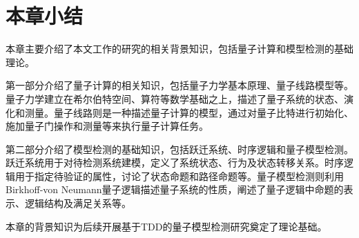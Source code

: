 \section{本章小结}
本章主要介绍了本文工作的研究的相关背景知识，包括量子计算和模型检测的基础理论。

第一部分介绍了量子计算的相关知识，包括量子力学基本原理、量子线路模型等。量子力学建立在希尔伯特空间、算符等数学基础之上，描述了量子系统的状态、演化和测量。量子线路则是一种描述量子计算的模型，通过对量子比特进行初始化、施加量子门操作和测量等来执行量子计算任务。

第二部分介绍了模型检测的基础知识，包括跃迁系统、时序逻辑和量子模型检测。跃迁系统用于对待检测系统建模，定义了系统状态、行为及状态转移关系。时序逻辑用于指定待验证的属性，讨论了状态命题和路径命题等。量子模型检测则利用Birkhoff-von Neumann量子逻辑描述量子系统的性质，阐述了量子逻辑中命题的表示、逻辑结构及满足关系等。

本章的背景知识为后续开展基于TDD的量子模型检测研究奠定了理论基础。

